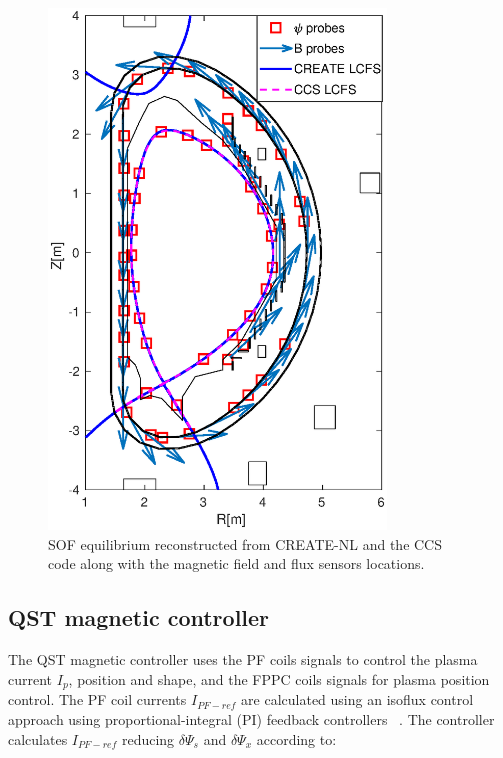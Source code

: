 \begin{figure}
	\centering
	\includegraphics[width=0.8\textwidth]{Chp3/sensors_plots_newDirection.eps}
	\caption{SOF equilibrium reconstructed from CREATE-NL and the CCS code along with the  magnetic field and flux sensors locations.	\label{JT60sensors} }
\end{figure}


\subsection{QST magnetic controller }


The QST magnetic controller  uses the PF coils signals to control the plasma current $I_p$, position and shape, and the FPPC coils signals for plasma position control. The PF coil currents $I_{PF-ref}$ are calculated using an isoflux control approach using proportional-integral (PI) feedback controllers   ~\cite{FBC}. The controller calculates $I_{PF-ref}$ reducing $\delta\Psi_s$ and $\delta\Psi_x$ according to:



